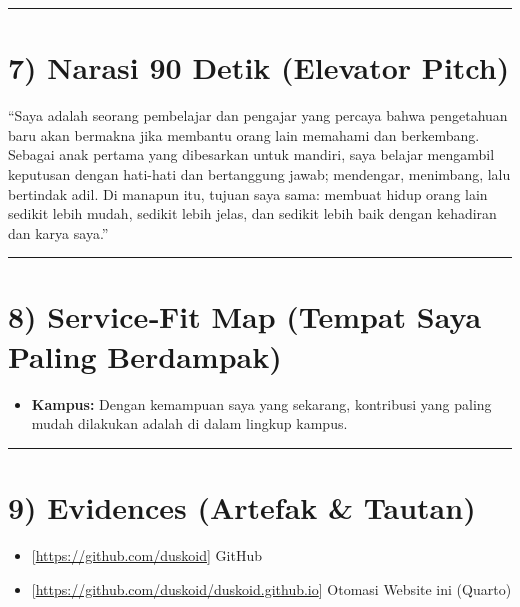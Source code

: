 \documentclass[
  letterpaper,
  DIV=11,
  numbers=noendperiod]{scrreprt}
\providecommand{\tightlist}{%
  \setlength{\itemsep}{0pt}\setlength{\parskip}{0pt}}\usepackage{longtable,booktabs,array}
\begin{document}
\begin{center}\rule{0.5\linewidth}{0.5pt}\end{center}

\section{7) Narasi 90 Detik (Elevator
Pitch)}\label{narasi-90-detik-elevator-pitch}

``Saya adalah seorang pembelajar dan pengajar yang percaya bahwa
pengetahuan baru akan bermakna jika membantu orang lain memahami dan
berkembang. Sebagai anak pertama yang dibesarkan untuk mandiri, saya
belajar mengambil keputusan dengan hati-hati dan bertanggung jawab;
mendengar, menimbang, lalu bertindak adil. Di manapun itu, tujuan saya
sama: membuat hidup orang lain sedikit lebih mudah, sedikit lebih jelas,
dan sedikit lebih baik dengan kehadiran dan karya saya.''

\begin{center}\rule{0.5\linewidth}{0.5pt}\end{center}

\section{8) Service‑Fit Map (Tempat Saya Paling
Berdampak)}\label{servicefit-map-tempat-saya-paling-berdampak}

\begin{itemize}
\tightlist
\item
  \textbf{Kampus:} Dengan kemampuan saya yang sekarang, kontribusi yang
  paling mudah dilakukan adalah di dalam lingkup kampus.
\end{itemize}

\begin{center}\rule{0.5\linewidth}{0.5pt}\end{center}

\section{9) Evidences (Artefak \&
Tautan)}\label{evidences-artefak-tautan}

\begin{itemize}
\tightlist
\item
  {[}\url{https://github.com/duskoid}{]} GitHub
\item
  {[}\url{https://github.com/duskoid/duskoid.github.io}{]} Otomasi
  Website ini (Quarto)
\end{itemize}
\end{document}
